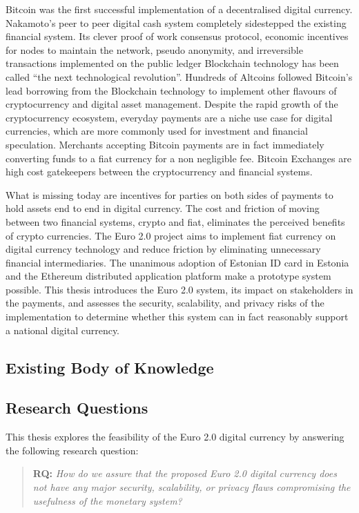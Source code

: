 \documentclass[12pt]{article} %
\begin{document}
Bitcoin was the first successful implementation of a decentralised digital currency. Nakamoto's peer to peer digital cash system completely sidestepped the existing financial system\cite{nakamoto2008bitcoin}. Its clever proof of work consensus protocol, economic incentives for nodes to maintain the network, pseudo anonymity, and irreversible transactions implemented on the public ledger Blockchain technology has been called ``the next technological revolution''. Hundreds of Altcoins followed Bitcoin's lead borrowing from the Blockchain technology to implement other flavours of cryptocurrency and digital asset management. Despite the rapid growth of the cryptocurrency ecosystem, everyday payments are a niche use case for digital currencies, which are more commonly used for investment and financial speculation\cite{Khairuddin:2016:EMB:2851581.2892500}. Merchants accepting Bitcoin payments are in fact immediately converting funds to a fiat currency for a non negligible fee. Bitcoin Exchanges are high cost gatekeepers between the cryptocurrency and financial systems.

What is missing today are incentives for parties on both sides of payments to hold assets end to end in digital currency. The cost and friction of moving between two financial systems, crypto and fiat, eliminates the perceived benefits of crypto currencies. The Euro 2.0 project aims to implement fiat currency on digital currency technology and reduce friction by eliminating unnecessary financial intermediaries. The unanimous adoption of Estonian ID card in Estonia and the Ethereum distributed application platform make a prototype system possible. This thesis introduces the Euro 2.0 system, its impact on stakeholders in the payments, and assesses the security, scalability, and privacy risks of the implementation to determine whether this system can in fact reasonably support a national digital currency.

\subsection{Existing Body of Knowledge}


\subsection{Research Questions}

This thesis explores the feasibility of the Euro 2.0 digital currency by answering the following research question:
\begin{quotation}
	\textbf{RQ: }\textit{How do we assure that the proposed Euro 2.0 digital currency does not have any major security, scalability, or privacy flaws compromising the usefulness of the monetary system?}
\end{quotation}
\end{document}
